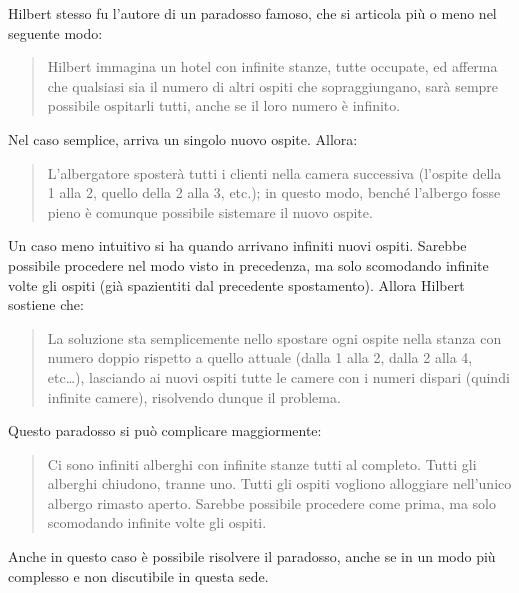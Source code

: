 \documentclass[a4paper,10pt]{article}
\begin{document}
Hilbert stesso fu l'autore di un paradosso famoso, che si articola più o meno nel seguente modo: \cite{wp-paradosso-hilbert}
\begin{quote}
Hilbert immagina un hotel con infinite stanze, tutte occupate, ed afferma che qualsiasi sia il numero di altri ospiti che sopraggiungano, sarà sempre possibile ospitarli tutti, anche se il loro numero è infinito.
\end{quote}
Nel caso semplice, arriva un singolo nuovo ospite. 
Allora:
\begin{quote}
L'albergatore sposterà tutti i clienti nella camera successiva (l'ospite della 1 alla 2, quello della 2 alla 3, etc.); in questo modo, benché l'albergo fosse pieno è comunque possibile sistemare il nuovo ospite.
\end{quote}
Un caso meno intuitivo si ha quando arrivano infiniti nuovi ospiti. Sarebbe possibile procedere nel modo visto in precedenza, ma solo scomodando infinite volte gli ospiti (già spazientiti dal precedente spostamento).
Allora Hilbert sostiene che:
\begin{quote}
La soluzione sta semplicemente nello spostare ogni ospite nella stanza con numero doppio rispetto a quello attuale (dalla 1 alla 2, dalla 2 alla 4, etc\dots), lasciando ai nuovi ospiti tutte le camere con i numeri dispari (quindi infinite camere), risolvendo dunque il problema.                                                                                                                                                                                                                                                                                                                                                                                                                                                                                                                                                                                               \end{quote} 
Questo paradosso si può complicare maggiormente:
\begin{quote}
Ci sono infiniti alberghi con infinite stanze tutti al completo. Tutti gli alberghi chiudono, tranne uno. Tutti gli ospiti vogliono alloggiare
nell'unico albergo rimasto aperto. Sarebbe possibile procedere come prima, ma solo scomodando infinite volte gli ospiti.
\end{quote}
Anche in questo caso è possibile risolvere il paradosso, anche se in un modo più complesso e non discutibile in questa sede.
\end{document}
